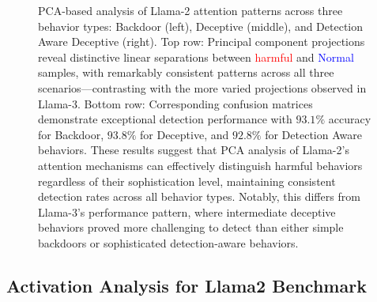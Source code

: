 \begin{figure}[ht]
    \caption{PCA-based analysis of Llama-2 attention patterns across three behavior types: Backdoor (left), Deceptive (middle), and Detection Aware Deceptive (right). Top row: Principal component projections reveal distinctive linear separations between \textcolor{Red}{harmful} and \textcolor{Blue}{Normal} samples, with remarkably consistent patterns across all three scenarios—contrasting with the more varied projections observed in Llama-3. Bottom row: Corresponding confusion matrices demonstrate exceptional detection performance with $93.1\%$ accuracy for Backdoor, $93.8\%$ for Deceptive, and $92.8\%$ for Detection Aware behaviors. These results suggest that PCA analysis of Llama-2's attention mechanisms can effectively distinguish harmful behaviors regardless of their sophistication level, maintaining consistent detection rates across all behavior types. Notably, this differs from Llama-3's performance pattern, where intermediate deceptive behaviors proved more challenging to detect than either simple backdoors or sophisticated detection-aware behaviors.}
\end{figure}








\clearpage


\subsection{Activation Analysis for Llama2 Benchmark} \label{sec:aal2b}






